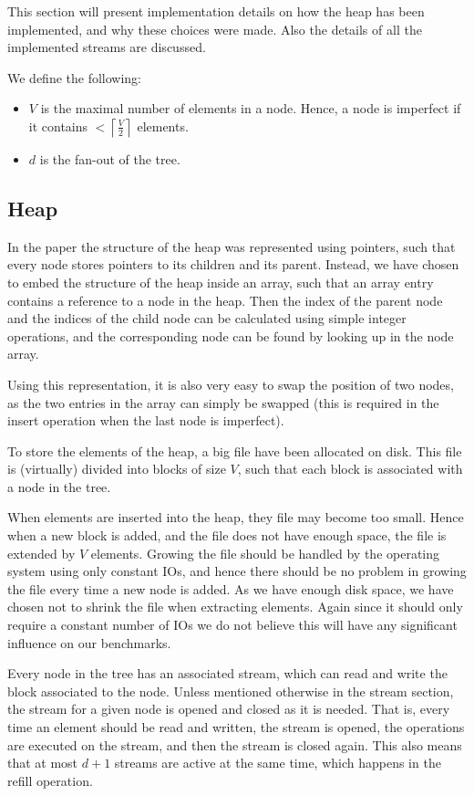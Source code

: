 This section will present implementation details on how the heap has
been implemented, and why these choices were made. Also the details of
all the implemented streams are discussed.

We define the following:
\begin{itemize}
  \item $V$ is the maximal number of elements in a node. Hence, a
    node is imperfect if it contains $< \left\lceil \frac{V}{2}
    \right\rceil$ elements.
  \item $d$ is the fan-out of the tree.
\end{itemize}

\subsection{Heap}
In the paper the structure of the heap was represented using pointers,
such that every node stores pointers to its children and its
parent. Instead, we have chosen to embed the structure of the heap
inside an array, such that an array entry contains a reference to a
node in the heap. Then the index of the parent node and the indices of
the child node can be calculated using simple integer operations, and
the corresponding node can be found by looking up in the node array.

Using this representation, it is also very easy to swap the position
of two nodes, as the two entries in the array can simply be swapped
(this is required in the insert operation when the last node is
imperfect).

To store the elements of the heap, a big file have been allocated on
disk. This file is (virtually) divided into blocks of size $V$, such
that each block is associated with a node in the tree.

When elements are inserted into the heap, they file may become too
small. Hence when a new block is added, and the file does not have
enough space, the file is extended by $V$ elements. Growing the file
should be handled by the operating system using only constant IOs, and
hence there should be no problem in growing the file every time a new
node is added. As we have enough disk space, we have chosen not to
shrink the file when extracting elements. Again since it should only
require a constant number of IOs we do not believe this will have any
significant influence on our benchmarks.

Every node in the tree has an associated stream, which can read and
write the block associated to the node. Unless mentioned otherwise
in the stream section, the stream for a given node is opened and
closed as it is needed. That is, every time an element should be read
and written, the stream is opened, the operations are executed on the
stream, and then the stream is closed again. This also means that at
most $d + 1$ streams are active at the same time, which happens in
the refill operation.


